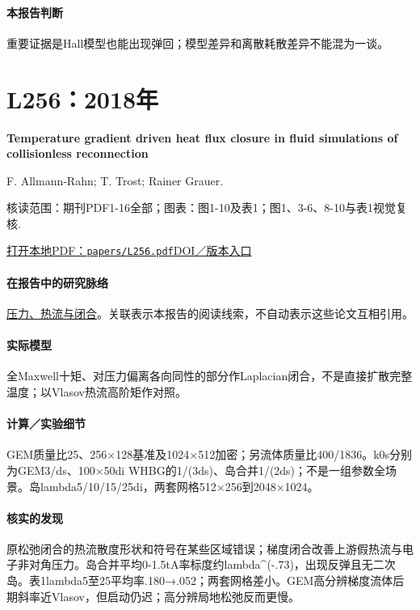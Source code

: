 \documentclass[UTF8,a4paper,11pt,openany,fontset=fandol]{ctexbook}
\begin{document}
\paragraph{本报告判断}重要证据是Hall模型也能出现弹回；模型差异和离散耗散差异不能混为一谈。

\section{L256：2018年}\label{paper:L256}

\textbf{Temperature gradient driven heat flux closure in fluid simulations of collisionless reconnection}\citep{L256}\

F. Allmann‐Rahn;  T. Trost;  Rainer Grauer.

\textsf{核读范围：}期刊PDF1-16全部；\textsf{图表：}图1-10及表1；图1、3-6、8-10与表1视觉复核.

\href{run:../papers/L256.pdf}{打开本地PDF：\texttt{papers/L256.pdf}}\quad\href{https://doi.org/10.1017/s002237781800048x}{DOI／版本入口}

\paragraph{在报告中的研究脉络}\hyperref[story:closure]{压力、热流与闭合}。关联表示本报告的阅读线索，不自动表示这些论文互相引用。

\paragraph{实际模型}全Maxwell十矩、对压力偏离各向同性的部分作Laplacian闭合，不是直接扩散完整温度；以Vlasov热流高阶矩作对照。

\paragraph{计算／实验细节}GEM质量比25、256×128基准及1024×512加密；另流体质量比400/1836。k0s分别为GEM3/ds、100×50di WHBG的1/(3ds)、岛合并1/(2ds)；不是一组参数全场景。岛lambda5/10/15/25di，两套网格512×256到2048×1024。

\paragraph{核实的发现}原松弛闭合的热流散度形状和符号在某些区域错误；梯度闭合改善上游假热流与电子非对角压力。岛合并平均0-1.5tA率标度约lambda\textasciicircum{}(-.73)，出现反弹且无二次岛。表1lambda5至25平均率.180→.052；两套网格差小。GEM高分辨梯度流体后期斜率近Vlasov，但启动仍迟；高分辨局地松弛反而更慢。
\end{document}
